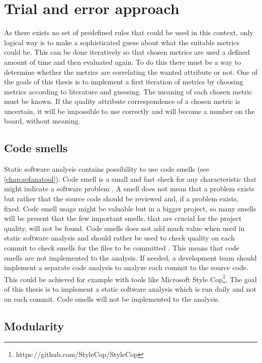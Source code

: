 \section{Trial and error approach}
As there exists no set of predefined rules that could be used in this context, only logical way is to make a sophisticated guess about what the suitable metrics could be. This can be done iteratively so that chosen metrics are used a defined amount of time and then evaluated again. To do this there must be a way to determine whether the metrics are correlating the wanted attribute or not. One of the goals of this thesis is to implement a first iteration of metrics by choosing metrics according to literature and guessing. The meaning of each chosen metric must be known. If the quality attribute correspondence of a chosen metric is uncertain, it will be impossible to use correctly and will become a number on the board, without meaning.

\subsection{Code smells}

Static software analysis contains possibility to use code smells (see \autoref{chap:sofanatool}). Code smell is a small and fast check for any characteristic that might indicate a software problem \cite{fowlercodesmell}. A smell does not mean that a problem exists but rather that the source code should be reviewed and, if a problem exists, fixed. Code smell usage might be valuable but in a bigger project, so many smells will be present that the few important smells, that are crucial for the project quality, will not be found. Code smells does not add much value when used in static software analysis and should rather be used to check quality on each commit to check smells for the files to be committed \cite{tufano2015and}. This means that code smells are not implemented to the analysis. If needed, a development team should implement a separate code analysis to analyze each commit to the source code. This could be achieved for example with tools like Microsoft Style Cop\footnote{https://github.com/StyleCop/StyleCop}. The goal of this thesis is to implement a static software analysis which is run daily and not on each commit. Code smells will not be implemented to the analysis. 

\subsection{Modularity}

